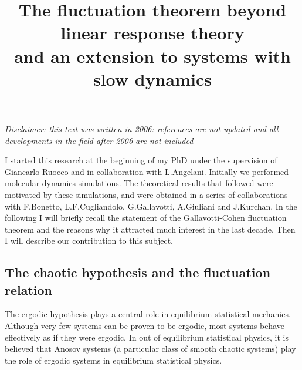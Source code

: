 \documentclass[pre,aps]{revtex4}
\begin{document}
\title{The fluctuation theorem beyond linear response theory \\ and
an extension to systems with slow dynamics}

\maketitle

{\it Disclaimer: this text was written in 2006: references are not updated and all developments
in the field after 2006 are not included}

\bigskip

I started this research at the beginning of my PhD under the supervision
of Giancarlo Ruocco and in collaboration with L.Angelani. 
Initially we performed molecular dynamics simulations.
The theoretical results that followed were motivated by these simulations, and were obtained 
in a series of collaborations with F.Bonetto, L.F.Cugliandolo, G.Gallavotti, A.Giuliani and J.Kurchan.
In the following I will briefly recall the statement of the
Gallavotti-Cohen fluctuation theorem and the reasons why it
attracted much interest in the last decade. 
Then I will describe our contribution to this subject.

\subsection{The chaotic hypothesis and the fluctuation relation}

The ergodic hypothesis plays a central role in equilibrium statistical mechanics.
Although very few systems can be proven to be ergodic, most systems behave effectively
as if they were ergodic. In out of equilibrium statistical physics, it is believed that
Anosov systems (a particular class of smooth chaotic systems) 
play the role of ergodic systems in equilibrium statistical physics.
\end{document}
